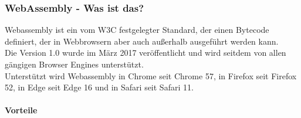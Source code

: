 \subsubsection{WebAssembly - Was ist das?}
Webassembly ist ein vom W3C festgelegter Standard, der einen Bytecode definiert, der in Webbrowsern aber auch außerhalb ausgeführt werden kann. \\
Die Version 1.0 wurde im März 2017 veröffentlicht und wird seitdem von allen gängigen Browser Engines unterstützt. \\
Unterstützt wird Webassembly in Chrome seit Chrome 57, in Firefox seit Firefox 52, in Edge seit Edge 16 und in Safari seit Safari 11. \cite*{caniusewasm} \\
\paragraph*{Vorteile}
